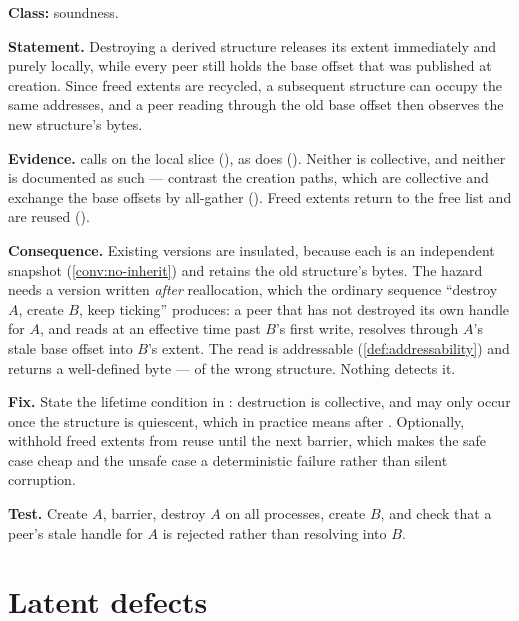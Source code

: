 \begin{deviation}
\label{dev:destroy-lifetime}
\textbf{Class:} soundness.

\textbf{Statement.} Destroying a derived structure releases its extent
immediately and purely locally, while every peer still holds the base offset
that was published at creation. Since freed extents are recycled, a subsequent
structure can occupy the same addresses, and a peer reading through the old
base offset then observes the new structure's bytes.

\textbf{Evidence.}  calls
 on the local slice (), as does
 (). Neither is collective,
and neither is documented as such --- contrast the creation paths, which are
collective and exchange the base offsets by all-gather
(). Freed extents return to the free list and are
reused ().

\textbf{Consequence.} Existing \glspl{version} are insulated, because each is
an independent snapshot (\cref{conv:no-inherit}) and retains the old
structure's bytes. The hazard needs a version written \emph{after}
reallocation, which the ordinary sequence ``destroy $A$, create $B$, keep
ticking'' produces: a peer that has not destroyed its own handle for $A$, and
reads at an effective time past $B$'s first write, resolves through $A$'s
stale base offset into $B$'s extent. The read is addressable
(\cref{def:addressability}) and returns a well-defined byte --- of the wrong
structure. Nothing detects it.

\textbf{Fix.} State the lifetime condition in : destruction is
collective, and may only occur once the structure is quiescent, which in
practice means after . Optionally, withhold freed extents
from reuse until the next barrier, which makes the safe case cheap and the
unsafe case a deterministic failure rather than silent corruption.

\textbf{Test.} Create $A$, barrier, destroy $A$ on all processes, create $B$,
and check that a peer's stale handle for $A$ is rejected rather than resolving
into $B$.
\end{deviation}

\section{Latent defects}

